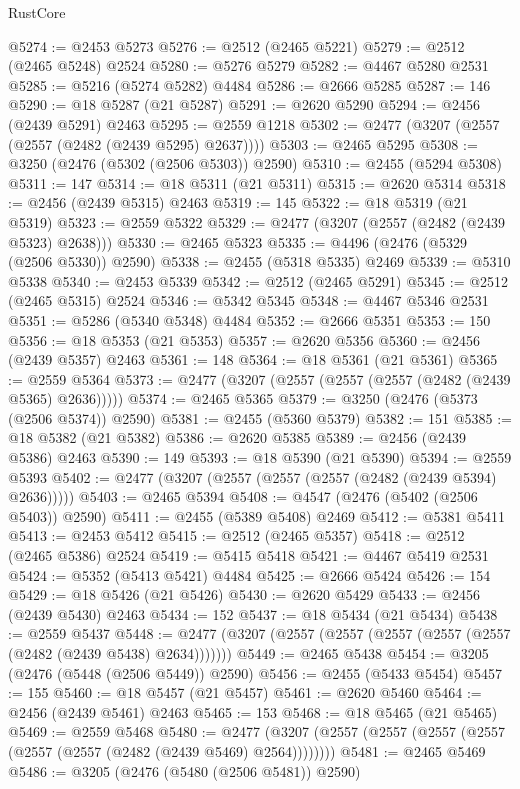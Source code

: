 \begin{lexlean}{RustCore}
\begin{coremodule}
@5274 := @2453 @5273
@5276 := @2512 (@2465 @5221)
@5279 := @2512 (@2465 @5248) @2524
@5280 := @5276 @5279
@5282 := @4467 @5280 @2531
@5285 := @5216 (@5274 @5282) @4484
@5286 := @2666 @5285
@5287 := 146
@5290 := @18 @5287 (@21 @5287)
@5291 := @2620 @5290
@5294 := @2456 (@2439 @5291) @2463
@5295 := @2559 @1218
@5302 := @2477 (@3207 (@2557 (@2557 (@2482 (@2439 @5295) @2637))))
@5303 := @2465 @5295
@5308 := @3250 (@2476 (@5302 (@2506 @5303)) @2590)
@5310 := @2455 (@5294 @5308)
@5311 := 147
@5314 := @18 @5311 (@21 @5311)
@5315 := @2620 @5314
@5318 := @2456 (@2439 @5315) @2463
@5319 := 145
@5322 := @18 @5319 (@21 @5319)
@5323 := @2559 @5322
@5329 := @2477 (@3207 (@2557 (@2482 (@2439 @5323) @2638)))
@5330 := @2465 @5323
@5335 := @4496 (@2476 (@5329 (@2506 @5330)) @2590)
@5338 := @2455 (@5318 @5335) @2469
@5339 := @5310 @5338
@5340 := @2453 @5339
@5342 := @2512 (@2465 @5291)
@5345 := @2512 (@2465 @5315) @2524
@5346 := @5342 @5345
@5348 := @4467 @5346 @2531
@5351 := @5286 (@5340 @5348) @4484
@5352 := @2666 @5351
@5353 := 150
@5356 := @18 @5353 (@21 @5353)
@5357 := @2620 @5356
@5360 := @2456 (@2439 @5357) @2463
@5361 := 148
@5364 := @18 @5361 (@21 @5361)
@5365 := @2559 @5364
@5373 := @2477 (@3207 (@2557 (@2557 (@2557 (@2482 (@2439 @5365) @2636)))))
@5374 := @2465 @5365
@5379 := @3250 (@2476 (@5373 (@2506 @5374)) @2590)
@5381 := @2455 (@5360 @5379)
@5382 := 151
@5385 := @18 @5382 (@21 @5382)
@5386 := @2620 @5385
@5389 := @2456 (@2439 @5386) @2463
@5390 := 149
@5393 := @18 @5390 (@21 @5390)
@5394 := @2559 @5393
@5402 := @2477 (@3207 (@2557 (@2557 (@2557 (@2482 (@2439 @5394) @2636)))))
@5403 := @2465 @5394
@5408 := @4547 (@2476 (@5402 (@2506 @5403)) @2590)
@5411 := @2455 (@5389 @5408) @2469
@5412 := @5381 @5411
@5413 := @2453 @5412
@5415 := @2512 (@2465 @5357)
@5418 := @2512 (@2465 @5386) @2524
@5419 := @5415 @5418
@5421 := @4467 @5419 @2531
@5424 := @5352 (@5413 @5421) @4484
@5425 := @2666 @5424
@5426 := 154
@5429 := @18 @5426 (@21 @5426)
@5430 := @2620 @5429
@5433 := @2456 (@2439 @5430) @2463
@5434 := 152
@5437 := @18 @5434 (@21 @5434)
@5438 := @2559 @5437
@5448 := @2477 (@3207 (@2557 (@2557 (@2557 (@2557 (@2557 (@2482 (@2439 @5438) @2634)))))))
@5449 := @2465 @5438
@5454 := @3205 (@2476 (@5448 (@2506 @5449)) @2590)
@5456 := @2455 (@5433 @5454)
@5457 := 155
@5460 := @18 @5457 (@21 @5457)
@5461 := @2620 @5460
@5464 := @2456 (@2439 @5461) @2463
@5465 := 153
@5468 := @18 @5465 (@21 @5465)
@5469 := @2559 @5468
@5480 := @2477 (@3207 (@2557 (@2557 (@2557 (@2557 (@2557 (@2557 (@2482 (@2439 @5469) @2564))))))))
@5481 := @2465 @5469
@5486 := @3205 (@2476 (@5480 (@2506 @5481)) @2590)

\end{coremodule}
\end{lexlean}
